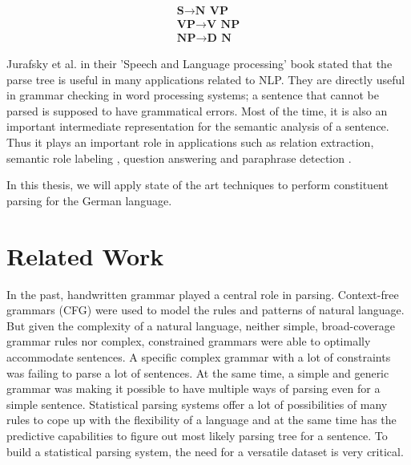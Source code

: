 \documentclass[a4paper, 11pt]{article}
\begin{document}
\begin{align*}
\textbf{S} \rightarrow \textbf{N}\  \, \textbf{VP} \\
\textbf{VP} \rightarrow \textbf{V}\  \, \textbf{NP} \\
\textbf{NP} \rightarrow \textbf{D}\  \, \textbf{N} 
\end{align*}

Jurafsky et al. \parencite{Jurafsky2008} in their 'Speech and Language processing' book stated that the parse tree is useful in many applications related to NLP. They are directly useful in grammar checking in word processing systems; a sentence that cannot be parsed is supposed to have grammatical errors. Most of the time, it is also an important intermediate representation for the semantic analysis of a sentence. Thus it plays an important role in applications such as relation extraction, semantic role labeling \parencite{Gildea:2002:NPP:1073083.1073124}, question answering and paraphrase detection \parencite{Callison-Burch2010}.


In this thesis, we will apply state of the art techniques to perform constituent parsing for the German language.


\pagebreak
\section{Related Work}

In the past, handwritten grammar played a central role in parsing. Context-free grammars (CFG) were used to model the rules and patterns of natural language. But given the complexity of a natural language, neither simple, broad-coverage grammar rules nor complex, constrained grammars were able to optimally accommodate sentences. A specific complex grammar with a lot of constraints was failing to parse a lot of sentences. At the same time, a simple and generic grammar was making it possible to have multiple ways of parsing even for a simple sentence. Statistical parsing systems offer a lot of possibilities of many rules to cope up with the flexibility of a language and at the same time has the predictive capabilities to figure out most likely parsing tree for a sentence. To build a statistical parsing system, the need for a versatile dataset is very critical. 
\end{document}
